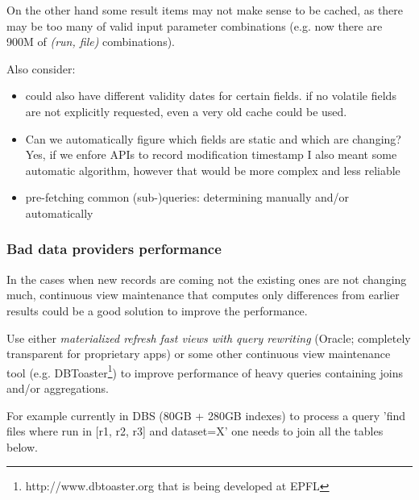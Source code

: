 On the other hand some result items may not make sense to be cached, as there may be too many of valid input parameter combinations (e.g. now there are 900M of \textit{(run, file)} combinations).

Also consider:
                			\begin{itemize}
                			\item could also have different validity dates for certain fields. if no volatile fields are not explicitly requested, even a very old cache could be used. 
                			\item Can we automatically figure which fields are static and which are changing?
                			 {\color{green} Yes, if we enfore APIs to record modification timestamp}
                			 {\color{red} I also meant some automatic algorithm, however that would be more complex and less reliable}
                			\item pre-fetching common (sub-)queries: determining manually and/or automatically
                			\end{itemize}





\subsubsection*{Bad data providers performance}
In the cases when new records are coming not the existing ones are not changing much, continuous view maintenance that computes only differences from earlier results could be a good solution to improve the performance. 


Use either \textit{materialized refresh fast views with query rewriting} (Oracle; completely transparent for proprietary apps)\cite{Oracle11}
 or some other continuous view maintenance tool (e.g. DBToaster\footnote{http://www.dbtoaster.org that is being developed at EPFL}) to improve performance of heavy queries containing joins and/or aggregations.

For example currently in DBS (80GB + 280GB indexes) to process a query 'find files where run in [r1, r2, r3] and dataset=X' one needs to join all the tables below.


